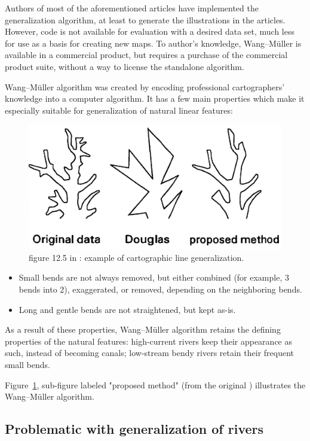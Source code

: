 \documentclass[a4paper]{article}
\newcommand{\titlecite}[1]{\citetitle{#1}\cite{#1}}
\newcommand{\WM}{Wang--M{\"u}ller}
\begin{document}
Authors of most of the aforementioned articles have implemented the
generalization algorithm, at least to generate the illustrations in the
articles. However, code is not available for evaluation with a desired data
set, much less for use as a basis for creating new maps. To author's knowledge,
{\WM}\cite{wang1998line} is available in a commercial product, but requires a
purchase of the commercial product suite, without a way to license the
standalone algorithm.

{\WM} algorithm was created by encoding professional cartographers' knowledge
into a computer algorithm. It has a few main properties which make it
especially suitable for generalization of natural linear features:

\begin{figure}[b]
    \centering
    \includegraphics[width=.8\textwidth]{wang125}
    \caption{figure 12.5 in \cite{wang1998line}: example of cartographic line
    generalization.}
    \label{fig:wang125}
\end{figure}

\begin{itemize}
    \item Small bends are not always removed, but either combined (for example,
        3 bends into 2), exaggerated, or removed, depending on the neighboring
        bends.
    \item Long and gentle bends are not straightened, but kept as-is.
\end{itemize}

As a result of these properties, {\WM} algorithm retains the defining
properties of the natural features: high-current rivers keep their appearance
as such, instead of becoming canals; low-stream bendy rivers retain their
frequent small bends.

Figure~\ref{fig:wang125}, sub-figure labeled "proposed method" (from the
original \titlecite{wang1998line}) illustrates the {\WM} algorithm.

\subsection{Problematic with generalization of rivers}
\end{document}
